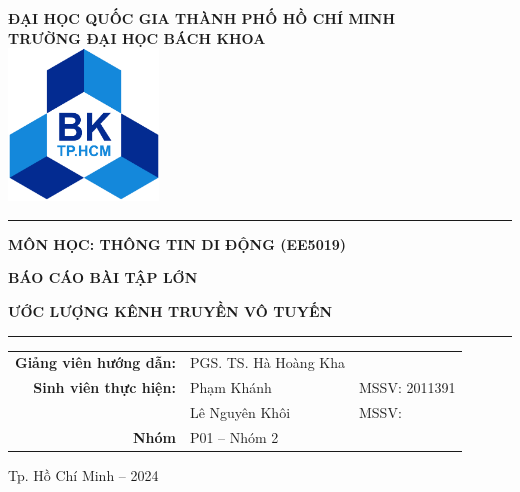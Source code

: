 \begin{titlepage}
    
    \begin{center}
    	\textbf{ĐẠI HỌC QUỐC GIA THÀNH PHỐ HỒ CHÍ MINH}\\[3pt]
    	\textbf{TRƯỜNG ĐẠI HỌC BÁCH KHOA}\\ 
    	
    	\vspace{1.5cm}
    	\includegraphics[width=4cm]{../images/logo_BK.png}
    	\vspace{0.5cm}
    \end{center}
    
    \begin{center}
        \setlength{\parskip}{.5em}
        \par\noindent\rule{0.8\textwidth}{0.4pt}

        \textbf{{MÔN HỌC: THÔNG TIN DI ĐỘNG (EE5019)}}
        
        \textbf{{\large BÁO CÁO BÀI TẬP LỚN}}
    	    
        \textbf{{ƯỚC LƯỢNG KÊNH TRUYỀN VÔ TUYẾN}}
        \par\noindent\rule{0.8\textwidth}{0.4pt}
    \end{center}
    
    \vspace{1em}
    \begin{center}
        \renewcommand{\arraystretch}{1.5}
        \begin{tabular}{R{0.35} L{0.3} L{0.25}}
            \textbf{Giảng viên hướng dẫn:} & PGS. TS. Hà Hoàng Kha\\
            \textbf{Sinh viên thực hiện:} & Phạm Khánh & MSSV: 2011391\\
            & Lê Nguyên Khôi & MSSV: \\
            \textbf{Nhóm} & P01 -- Nhóm 2 & 
        \end{tabular}
    \end{center}
    
    \vfill
    \begin{center}
        Tp. Hồ Chí Minh -- 2024
    \end{center}
    \vspace{1em}
\end{titlepage}